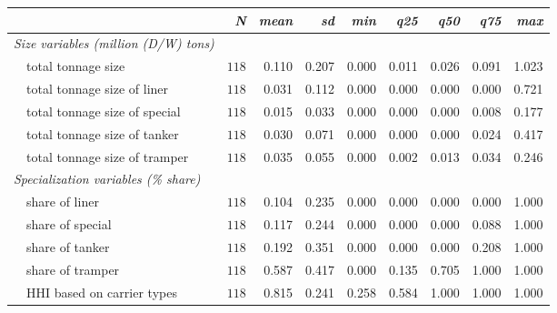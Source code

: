 \begin{tabular}{lrrrrrrrr}
\toprule
\multicolumn{1}{l}{\itshape }&\multicolumn{1}{r}{\itshape N}&\multicolumn{1}{r}{\itshape mean}&\multicolumn{1}{r}{\itshape sd}&\multicolumn{1}{r}{\itshape min}&\multicolumn{1}{r}{\itshape q25}&\multicolumn{1}{r}{\itshape q50}&\multicolumn{1}{r}{\itshape q75}&\multicolumn{1}{r}{\itshape max}\tabularnewline
\midrule
{\itshape Size variables (million (D/W) tons)}&&&&&&&&\tabularnewline
~~total tonnage size&$118$&0.110&0.207&0.000&0.011&0.026&0.091&1.023\tabularnewline
~~total tonnage size of liner&$118$&0.031&0.112&0.000&0.000&0.000&0.000&0.721\tabularnewline
~~total tonnage size of special&$118$&0.015&0.033&0.000&0.000&0.000&0.008&0.177\tabularnewline
~~total tonnage size of tanker&$118$&0.030&0.071&0.000&0.000&0.000&0.024&0.417\tabularnewline
~~total tonnage size of tramper&$118$&0.035&0.055&0.000&0.002&0.013&0.034&0.246\tabularnewline
\midrule
{\itshape Specialization variables (\% share)}&&&&&&&&\tabularnewline
~~share of liner&$118$&0.104&0.235&0.000&0.000&0.000&0.000&1.000\tabularnewline
~~share of special&$118$&0.117&0.244&0.000&0.000&0.000&0.088&1.000\tabularnewline
~~share of tanker&$118$&0.192&0.351&0.000&0.000&0.000&0.208&1.000\tabularnewline
~~share of tramper&$118$&0.587&0.417&0.000&0.135&0.705&1.000&1.000\tabularnewline
~~HHI based on carrier types&$118$&0.815&0.241&0.258&0.584&1.000&1.000&1.000\tabularnewline
\bottomrule
\end{tabular}
